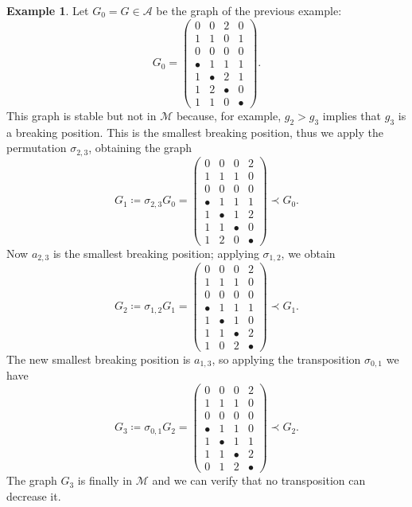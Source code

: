 \documentclass{amsart}
\theoremstyle{plain}
\theoremstyle{definition}
\newtheorem{example}[theorem]{Example}
\begin{document}
\begin{example}
  Let $G_0 = G \in \mathcal{A}$ be the graph of the previous
  example:
  \[
  G_0 = \begin{pmatrix} 0 & 0 & 2 & 0\\ 
  1 & 1 & 0 & 1\\ 
  0 & 0 & 0 & 0 \\ 
  \hline 
  \bullet & 1 & 1 & 1\\ 
  1 &\bullet & 2 & 1 \\ 
  1& 2&\bullet & 0\\ 
  1&1&0& \bullet 
  \end{pmatrix}\text{.}
  \]
  This graph is stable but not in $\mathcal{M}$ because, for example,
  $g_2 > g_3$ implies that $g_3$ is a breaking position. This is
  the smallest breaking position, thus we apply the permutation $\sigma_{2,3}$, obtaining
  the graph
  \[
  G_1 \coloneqq \sigma_{2,3} G_0 = \begin{pmatrix} 0 & 0 & 0 & 2\\
    1 & 1 & 1 & 0\\
    0 & 0 & 0 & 0\\ \hline
    \bullet & 1 & 1 & 1\\
    1&\bullet& 1 & 2\\ 
    1&1&\bullet& 0 \\
    1&2&0& \bullet \end{pmatrix}
  \prec G_0\text{.}
  \]
  Now $a_{2,3}$ is the smallest breaking position; applying
  $\sigma_{1,2}$, we obtain
  \[
  G_2 \coloneqq \sigma_{1,2} G_1 = \begin{pmatrix} 0 & 0 & 0 & 2\\ 1 & 1 & 1 &
    0\\ 0 & 0 & 0 & 0\\\hline \bullet & 1 & 1 & 1\\ 1&\bullet& 1 & 0\\ 1&1&\bullet& 2 \\ 1&0&2& \bullet \end{pmatrix} \prec
  G_1\text{.}
  \]
  The new smallest breaking position is $a_{1,3}$, so applying the
  transposition $\sigma_{0,1}$ we have
  \[
  G_3 \coloneqq \sigma_{0,1} G_2 = \begin{pmatrix} 0 & 0 & 0 & 2\\ 1 & 1 & 1 &
    0\\ 0 & 0 & 0 & 0\\ \hline \bullet & 1 & 1 & 0\\ 1&\bullet& 1 & 1\\ 1&1&\bullet& 2\\ 0&1&2& \bullet \end{pmatrix} \prec
  G_2\text{.}
  \]
  The graph $G_3$ is finally in $\mathcal{M}$ and we can verify that no
  transposition can decrease it.
\end{example}
\end{document}
